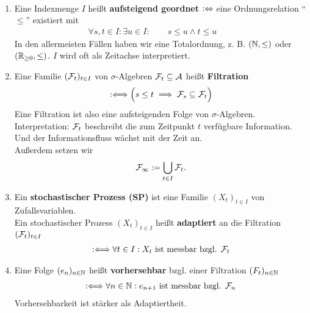 \begin{defi}\
\begin{enumerate}[label=(\alph*)]
\item Eine Indexmenge $I$ heißt \textbf{aufsteigend geordnet} $:\Leftrightarrow$ eine Ordnungsrelation ``$\leq$'' existiert mit
\begin{align*}
\forall s,t\in I:\exists u\in I:\qquad s\leq u\wedge t\leq u\qquad 
\end{align*}
In den allermeisten Fällen haben wir eine Totalordnung, z. B. $(\mathbb{N},\leq)$ oder $(\mathbb{R}_{\geq0},\leq)$. $I$ wird oft als Zeitachse interpretiert.
\item Eine Familie $(\mathcal{F}_t)_{t\in I}$ von $\sigma$-Algebren $\mathcal{F}_t\subseteq\mathcal{A}$ heißt \textbf{Filtration} 
\begin{align*}
:\Longleftrightarrow\Big( s\leq t\implies\mathcal{F}_s\subseteq\mathcal{F}_t\Big)
\end{align*}
Eine Filtration ist also eine aufsteigenden Folge von $\sigma$-Algebren.\\
Interpretation: $\mathcal{F}_t$ beschreibt die zum Zeitpunkt $t$ verfügbare Information. Und der Informationsfluss wächst mit der Zeit an.\\
Außerdem setzen wir
\begin{align*}
\mathcal{F}_\infty:=\bigcup\limits_{t\in I}\mathcal{F}_t.
\end{align*}
\item Ein \textbf{stochastischer Prozess (SP)} ist eine Familie $(X_t)_{t\in I}$ von Zufallsvariablen.\\
Ein stochastischer Prozess $(X_t)_{t\in I}$ heißt \textbf{adaptiert} an die Filtration $(\mathcal{F}_t)_{t\in I}$
\begin{align*}
:\Longleftrightarrow\forall t\in I: X_t\text{ ist messbar bzgl. }\mathcal{F}_t
\end{align*}
\item Eine Folge $(e_n)_{n\in\mathbb{N}}$ heißt \textbf{vorhersehbar} bzgl. einer Filtration $(F_t)_{n\in\mathbb{N}}$
\begin{align*}
:\Longleftrightarrow\forall n\in\mathbb{N}:e_{n+1}\text{ ist messbar bzgl. }\mathcal{F}_n
\end{align*}
Vorhersehbarkeit ist stärker als Adaptiertheit.
\end{enumerate}
\end{defi}


